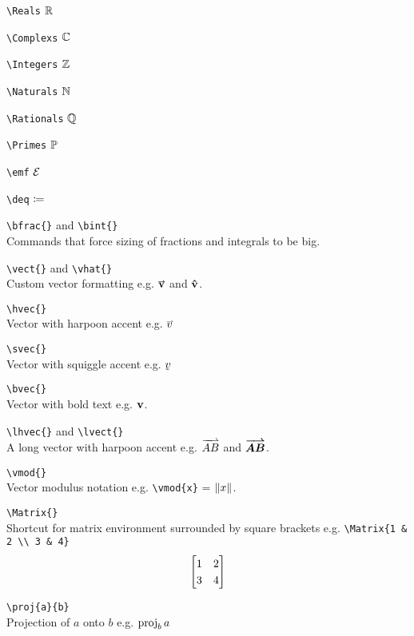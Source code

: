 \documentclass[a4paper, 12pt, english]{article}
\begin{document}
            \verb+\Reals+ $\Reals$
            
            \verb+\Complexs+ $\Complexs$
            
            \verb+\Integers+ $\Integers$
            
            \verb+\Naturals+ $\Naturals$
            
            \verb+\Rationals+ $\Rationals$ 

            \verb+\Primes+ $\Primes$

            \verb+\emf+ $\emf$

            \verb+\deq+ $\deq$

            \verb+\bfrac{}+ and \verb+\bint{}+\\
            Commands that force sizing of fractions and integrals to be big.
            
            \verb+\vect{}+ and \verb+\vhat{}+\\
            Custom vector formatting e.g. $\vect{v}$ and $\vhat{v}$.

            \verb+\hvec{}+\\
            Vector with harpoon accent e.g. $\hvec{v}$

            \verb+\svec{}+\\
            Vector with squiggle accent e.g. $\svec{v}$

            \verb+\bvec{}+\\
            Vector with bold text e.g. $\bvec{v}$.

            \verb+\lhvec{}+ and \verb+\lvect{}+\\
            A long vector with harpoon accent e.g. $\lhvec{AB}$ and $\lvect{AB}$.

            \verb+\vmod{}+\\
            Vector modulus notation e.g. \verb+\vmod{x}+ = $\vmod{x}$.

            \verb+\Matrix{}+\\
            Shortcut for matrix environment surrounded by square brackets e.g. \verb+\Matrix{1 & 2 \\ 3 & 4}+
            \begin{equation*}
                \Matrix{1 & 2 \\ 3 & 4}
            \end{equation*}

            \verb+\proj{a}{b}+\\
            Projection of $a$ onto $b$ e.g. $\proj{a}{b}$
\end{document}
